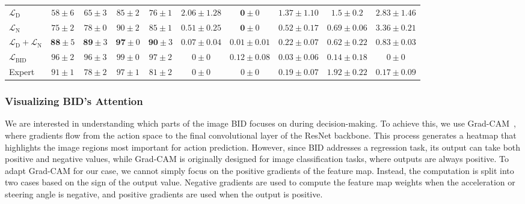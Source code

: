\begin{table}
\begin{tabular}{lccccccccc}
		$\mathcal{L}_\text{D}$
		& $58\pm6$ & $65\pm3$ & $85\pm2$ & $76\pm1$ 
		& $2.06\pm1.28$ & $\mathbf{0}\pm0$ & $1.37\pm1.10$ & $1.5\pm0.2$ & $2.83\pm1.46$ \\
		$\mathcal{L}_\text{N}$
		& $75\pm2$ & $78\pm0$ & $90\pm2$ & $85\pm1$ 
		& $0.51\pm0.25$ & $\mathbf{0}\pm0$ & $0.52\pm0.17$ & $0.69\pm0.06$ & $3.36\pm0.21$ \\
		$\mathcal{L}_\text{D}+\mathcal{L}_\text{N}$
		& $\mathbf{88} \pm 5$ & $\mathbf{89} \pm 3$ & $\mathbf{97} \pm 0$ & $\mathbf{90} \pm 3$ 
		& $\mathbf{0.07} \pm 0.04$ & $0.01 \pm 0.01$ & $\mathbf{0.22} \pm 0.07$ & $\mathbf{0.62} \pm 0.22$ & $\mathbf{0.83} \pm 0.03$ \\
		\hline
		$\mathcal{L}_\text{BID}$
		& $96 \pm 2$ & $96 \pm 3$ & $99 \pm 0$ & $97 \pm 2$ 
		& $0 \pm 0$ & $0.12 \pm 0.08$ & $0.03 \pm 0.06$ & $0.14 \pm 0.18$ & $0 \pm 0$ \\
		Expert
		& $91 \pm 1$ & $78 \pm 2$ & $97 \pm 1$ & $81 \pm 2$ 
		& $0 \pm 0$ & $0 \pm 0$ & $0.19 \pm 0.07$ & $1.92 \pm 0.22$ & $0.17 \pm 0.09$\\
		\hline
	\end{tabular}
	\vspace{-1ex}
	\vspace{-2.5ex}
	\label{table:infraction}
\end{table}


\subsubsection{Visualizing BID's Attention}
\label{sec:Visualization}
\hspace{1pc}We are interested in understanding which parts of the image BID focuses on during decision-making. 
To achieve this, we use Grad-CAM~\cite{Selvaraju:2017}, where gradients flow from the action space to the final convolutional layer of the ResNet backbone. 
This process generates a heatmap that highlights the image regions most important for action prediction. 
However, since BID addresses a regression task, its output can take both positive and negative values, while Grad-CAM is originally designed for image classification tasks, where outputs are always positive. 
To adapt Grad-CAM for our case, we cannot simply focus on the positive gradients of the feature map. 
Instead, the computation is split into two cases based on the sign of the output value. 
Negative gradients are used to compute the feature map weights when the acceleration or steering angle is negative, and positive gradients are used when the output is positive.


